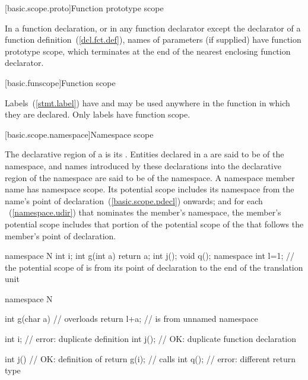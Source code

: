 [basic.scope.proto]{Function prototype scope}

\pnum
{}%
%
In a function declaration, or in any function declarator except the
declarator of a function definition~(\ref{dcl.fct.def}), names of
parameters (if supplied) have function prototype scope, which terminates
at the end of the nearest enclosing function declarator.

[basic.funscope]{Function scope}

\pnum
{}%
Labels~(\ref{stmt.label}) have  and
may be used anywhere in the function in which they are declared. Only
labels have function scope.

[basic.scope.namespace]{Namespace scope}

\pnum
{}%
The declarative region of a  is its
.  Entities declared in a
 are said to be  of the
namespace, and names introduced by these declarations into the
declarative region of the namespace are said to be  of the namespace. A namespace member name has namespace scope.
Its potential scope includes its namespace from the name's point of
declaration~(\ref{basic.scope.pdecl}) onwards; and for each
~(\ref{namespace.udir}) that nominates the
member's namespace, the member's potential scope includes that portion
of the potential scope of the  that follows
the member's point of declaration. \begin{example}

\begin{codeblock}
namespace N {
  int i;
  int g(int a) { return a; }
  int j();
  void q();
}
namespace { int l=1; }
// the potential scope of  is from its point of declaration to the end of the translation unit

namespace N {
  int g(char a) {   // overloads 
    return l+a;     //  is from unnamed namespace
  }

  int i;            // error: duplicate definition
  int j();          // OK: duplicate function declaration

  int j() {         // OK: definition of 
    return g(i);    // calls 
  }
  int q();          // error: different return type
}
\end{codeblock}
\end{example}

